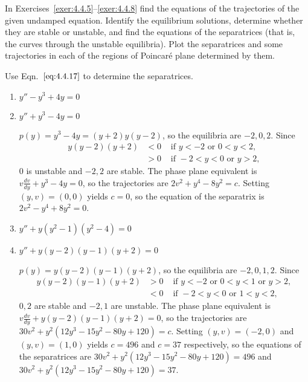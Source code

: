 \documentclass{ximera}
\begin{document}
\begin{problem}
In Exercises~\ref{exer:4.4.5}--\ref{exer:4.4.8} find the equations of the
trajectories of the given undamped equation. Identify the equilibrium
solutions,
determine whether they are stable or unstable, and find the equations
of the separatrices (that is, the curves through the unstable
equilibria). Plot the separatrices and some
trajectories in each of the regions of Poincar\'e plane determined by
them. 
\begin{hint}
  Use Eqn.~$\eqref{eq:4.4.17}$ to determine the separatrices.  
\end{hint}

\begin{enumerate}
\item\label{exer:4.4.5}   $y''-y^3+4y=0$

\item\label{exer:4.4.6}   $y''+y^3-4y=0$

\begin{solution}
$p(y)=y^3-4y=(y+2)y(y-2)$, so the
 equilibria are $-2,0,2$.
Since
$$
\begin{array}{rcl}
y(y-2)(y+2)&<0& \mbox{ if } y<-2\mbox{ or }0<y<2,\\
&>0&\mbox{ if }-2<y<0\mbox{ or }y>2,
\end{array}
$$
$0$ is unstable and $-2,2$ are stable. The phase plane equivalent is
$v\frac{dv}{dy}+y^3-4y=0$, so the trajectories are
$2v^2+y^4-8y^2=c$. Setting $(y,v)=(0,0)$ yields $c=0$, so the equation
of the separatrix is $2v^2-y^4+8y^2=0$.
\end{solution}

\item\label{exer:4.4.7}   $y''+y(y^2-1)(y^2-4)=0$

\item\label{exer:4.4.8}   $y''+y(y-2)(y-1)(y+2)=0$

\begin{solution}
$p(y)=y(y-2)(y-1)(y+2)$, so the
 equilibria are $-2,0,1,2$.
Since
$$
\begin{array}{rcl}
y(y-2)(y-1)(y+2)&>0& \mbox{ if } y<-2\mbox{ or }0<y<1\mbox{ or }
y>2,\\
&<0&\mbox{ if }-2<y<0\mbox{ or }1<y<2,
\end{array}
$$
$0,2$ are stable and $-2,1$ are unstable. The phase plane
equivalent is
$v\frac{dv}{dy}+y(y-2)(y-1)(y+2)=0$, so the trajectories are
$30v^2+y^2(12y^3-15y^2-80y+120)=c$. Setting $(y,v)=(-2,0)$
and $(y,v)=(1,0)$
yields
$c=496$ and $c=37$ respectively, so the equations of the separatrices
are $30v^2+y^2(12y^3-15y^2-80y+120)=496$
and $30v^2+y^2(12y^3-15y^2-80y+120)=37$.
\end{solution}
\end{enumerate}
\end{problem}
\end{document}
